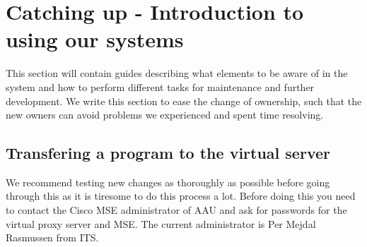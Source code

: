 \section{Catching up - Introduction to using our systems}
This section will contain guides describing what elements to be aware of in the system and how to perform different tasks for maintenance and further development. We write this section to ease the change of ownership, such that the new owners can avoid problems we experienced and spent time resolving. 

\subsection*{Transfering a program to the virtual server}
We recommend testing new changes as thoroughly as possible before going through this as it is tiresome to do this process a lot. Before doing this you need to contact the Cisco MSE administrator of AAU and ask for passwords for the virtual proxy server and MSE. The current administrator is Per Mejdal Rasmussen from ITS. 

